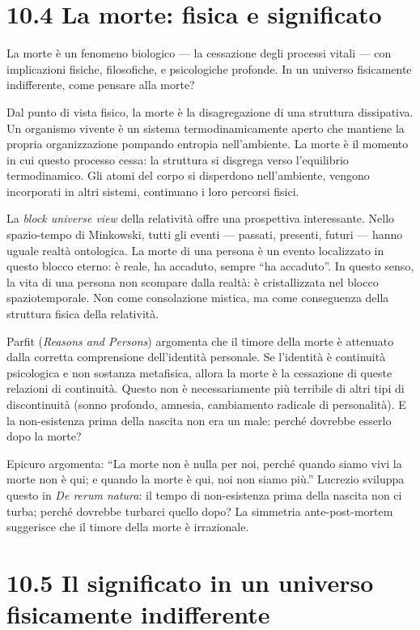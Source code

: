 \documentclass[11.5pt,a4paper,openany]{book}
\theoremstyle{remark}
\begin{document}
\section{10.4 La morte: fisica e significato}

La morte è un fenomeno biologico --- la cessazione degli processi vitali --- con implicazioni fisiche, filosofiche, e psicologiche profonde. In un universo fisicamente indifferente, come pensare alla morte?

Dal punto di vista fisico, la morte è la disagregazione di una struttura dissipativa. Un organismo vivente è un sistema termodinamicamente aperto che mantiene la propria organizzazione pompando entropia nell'ambiente. La morte è il momento in cui questo processo cessa: la struttura si disgrega verso l'equilibrio termodinamico. Gli atomi del corpo si disperdono nell'ambiente, vengono incorporati in altri sistemi, continuano i loro percorsi fisici.

La \textit{block universe view} della relatività offre una prospettiva interessante. Nello spazio-tempo di Minkowski, tutti gli eventi --- passati, presenti, futuri --- hanno uguale realtà ontologica. La morte di una persona è un evento localizzato in questo blocco eterno: è reale, ha accaduto, sempre ``ha accaduto''. In questo senso, la vita di una persona non scompare dalla realtà: è cristallizzata nel blocco spaziotemporale. Non come consolazione mistica, ma come conseguenza della struttura fisica della relatività.

Parfit (\textit{Reasons and Persons}) argomenta che il timore della morte è attenuato dalla corretta comprensione dell'identità personale. Se l'identità è continuità psicologica e non sostanza metafisica, allora la morte è la cessazione di queste relazioni di continuità. Questo non è necessariamente più terribile di altri tipi di discontinuità (sonno profondo, amnesia, cambiamento radicale di personalità). E la non-esistenza prima della nascita non era un male: perché dovrebbe esserlo dopo la morte?

Epicuro argomenta: ``La morte non è nulla per noi, perché quando siamo vivi la morte non è qui; e quando la morte è qui, noi non siamo più.'' Lucrezio sviluppa questo in \textit{De rerum natura}: il tempo di non-esistenza prima della nascita non ci turba; perché dovrebbe turbarci quello dopo? La simmetria ante-post-mortem suggerisce che il timore della morte è irrazionale.

\section{10.5 Il significato in un universo fisicamente indifferente}
\end{document}
